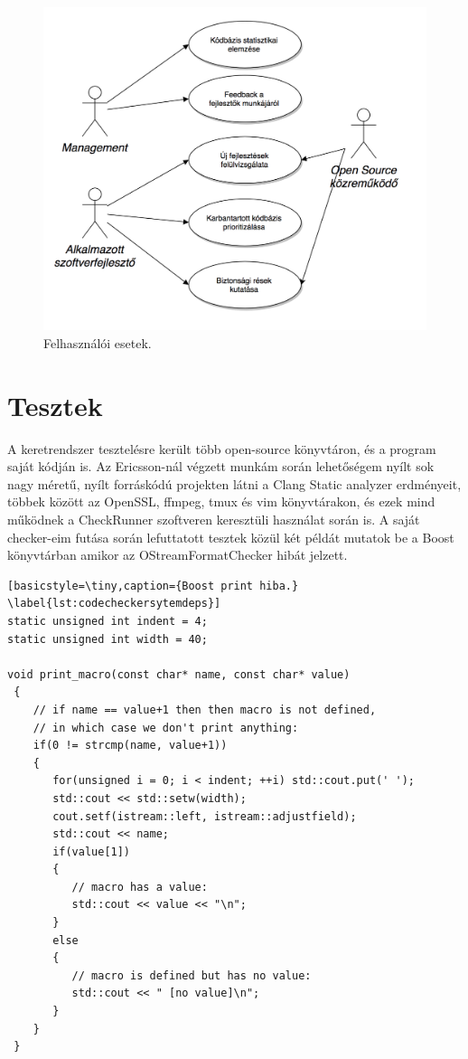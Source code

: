 \documentclass[a4paper,12pt]{report}
\begin{document}
\begin{figure}[h]
\caption{Felhasználói esetek.}
\centering
\includegraphics[scale=0.7]{felhasznaloi.png}
\end{figure}

\chapter{Tesztek}
A keretrendszer tesztelésre került több open-source könyvtáron, és a program saját kódján is. Az Ericsson-nál végzett munkám során lehetőségem nyílt sok nagy méretű, nyílt forráskódú projekten látni a Clang Static analyzer erdményeit, többek között az OpenSSL, ffmpeg, tmux és vim könyvtárakon, és ezek mind működnek a CheckRunner szoftveren keresztüli használat során is. A saját checker-eim futása során lefuttatott tesztek közül két példát mutatok be a Boost könyvtárban amikor az OStreamFormatChecker hibát jelzett.

\begin{lstlisting}[basicstyle=\tiny,caption={Boost print hiba.}
\label{lst:codecheckersytemdeps}]
static unsigned int indent = 4;
static unsigned int width = 40;

void print_macro(const char* name, const char* value)
 {
    // if name == value+1 then then macro is not defined,
    // in which case we don't print anything:
    if(0 != strcmp(name, value+1))
    {
       for(unsigned i = 0; i < indent; ++i) std::cout.put(' ');
       std::cout << std::setw(width);
       cout.setf(istream::left, istream::adjustfield);
       std::cout << name;
       if(value[1])
       {
          // macro has a value:
          std::cout << value << "\n";
       }
       else
       {
          // macro is defined but has no value:
          std::cout << " [no value]\n";
       }
    }
 }
\end{lstlisting}
\end{document}
